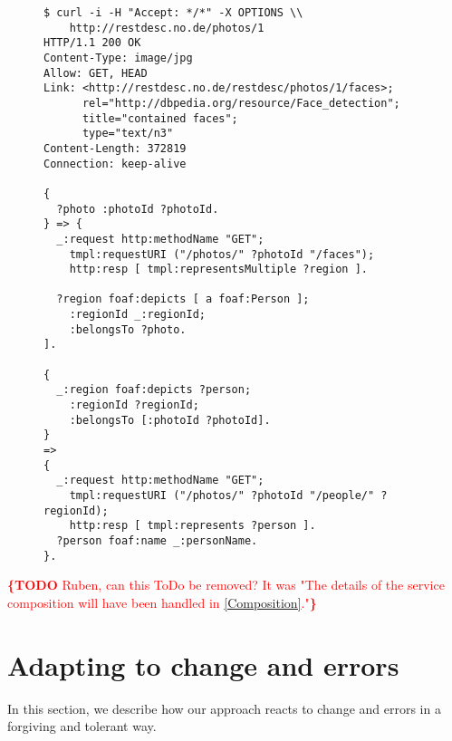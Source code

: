 \documentclass[runningheads,a4paper, twocolumn]{llncs}
\newcommand{\todo}[1]{\noindent\textcolor{red}{{\bf \{TODO} #1{\bf \}}}}
\begin{document}
\begin{figure}[float=h!]
\begin{lstlisting}[caption=Listing showing an OPTIONS call in order to find out about ones options with a concrete photo., label=lst:PhotoOPTIONS, escapechar=§]
$ curl -i -H "Accept: */*" -X OPTIONS \\
    http://restdesc.no.de/photos/1
HTTP/1.1 200 OK
Content-Type: image/jpg
Allow: GET, HEAD
Link: <http://restdesc.no.de/restdesc/photos/1/faces>;
      rel="http://dbpedia.org/resource/Face_detection";
      title="contained faces";
      type="text/n3"
Content-Length: 372819
Connection: keep-alive

{
  ?photo :photoId ?photoId.
} => {
  _:request http:methodName "GET";
    tmpl:requestURI ("/photos/" ?photoId "/faces");
    http:resp [ tmpl:representsMultiple ?region ].
    
  ?region foaf:depicts [ a foaf:Person ];
    :regionId _:regionId;
    :belongsTo ?photo.    
].

{
  _:region foaf:depicts ?person;
    :regionId ?regionId;
    :belongsTo [:photoId ?photoId].
}
=>
{
  _:request http:methodName "GET";
    tmpl:requestURI ("/photos/" ?photoId "/people/" ?regionId);
    http:resp [ tmpl:represents ?person ].
  ?person foaf:name _:personName.
}.
\end{lstlisting}
\end{figure}

\todo{Ruben, can this ToDo be removed? It was "The details of the service composition will have been handled in \ref{Composition}."}

\begin{comment}
\section{Linking with external services}
\subsection{\todo{Theory}}
\subsection{\todo{Google Docs story 2}}
\end{comment}

\section{Adapting to change and errors} \label{sec:adapting-to-change-and-errors}
In this section, we describe how our  approach reacts to change and errors in a forgiving and tolerant way.
\end{document}

